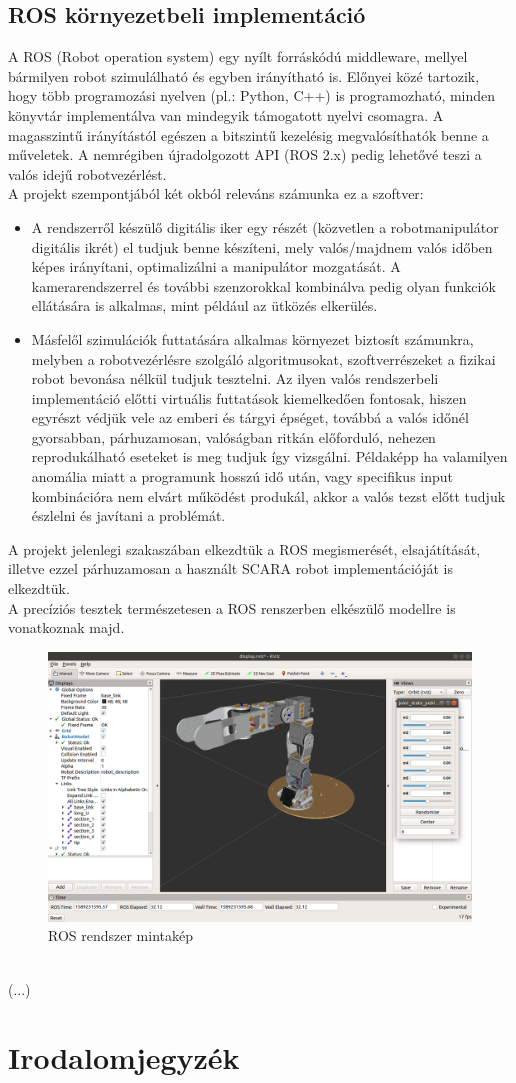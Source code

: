 \documentclass{article}
\begin{document}
\subsection{ROS környezetbeli implementáció}
A ROS (Robot operation system) egy nyílt forráskódú middleware, mellyel
bármilyen robot szimulálható és egyben irányítható is. Előnyei közé 
tartozik, hogy több programozási nyelven (pl.: Python, C++) is programozható,
minden könyvtár implementálva van mindegyik támogatott nyelvi csomagra. 
A magasszintű irányítástól egészen a bitszintű kezelésig megvalósíthatók
benne a műveletek. A nemrégiben újradolgozott API (ROS 2.x) pedig lehetővé teszi 
a valós idejű robotvezérlést.\\[5pt]
A projekt szempontjából két okból releváns számunka ez a szoftver:
\begin{itemize}
  \item A rendszerről készülő digitális iker egy részét (közvetlen a 
  robotmanipulátor digitális ikrét) el tudjuk benne készíteni, mely 
  valós/majdnem valós időben képes irányítani, optimalizálni a manipulátor
  mozgatását. A kamerarendszerrel és további szenzorokkal kombinálva pedig 
  olyan funkciók ellátására is alkalmas, mint például az ütközés elkerülés.
  \item Másfelől szimulációk futtatására alkalmas környezet biztosít számunkra,
        melyben a robotvezérlésre szolgáló algoritmusokat, szoftverrészeket
        a fizikai robot bevonása nélkül tudjuk tesztelni. Az ilyen valós
        rendszerbeli implementáció előtti virtuális futtatások kiemelkedően fontosak,
        hiszen egyrészt védjük vele az emberi és tárgyi épséget, továbbá 
        a valós időnél gyorsabban, párhuzamosan, valóságban ritkán előforduló,
        nehezen reprodukálható eseteket is meg tudjuk így vizsgálni. Példaképp
        ha valamilyen anomália miatt a programunk hosszú idő után, vagy specifikus
        input kombinációra nem elvárt működést produkál, akkor a valós tezst előtt
        tudjuk észlelni és javítani a problémát.
\end{itemize}
A projekt jelenlegi szakaszában elkezdtük a ROS megismerését, elsajátítását,
illetve ezzel párhuzamosan a használt SCARA robot implementációját is elkezdtük.\\[5pt]
A precíziós tesztek természetesen a ROS renszerben elkészülő modellre 
is vonatkoznak majd.
\begin{figure}[h]
  \centering
  \includegraphics[scale=0.5]{ros_template.png}
  \caption{ROS rendszer mintakép}
\end{figure}\\
(...)
\section{Irodalomjegyzék}
\end{document}
